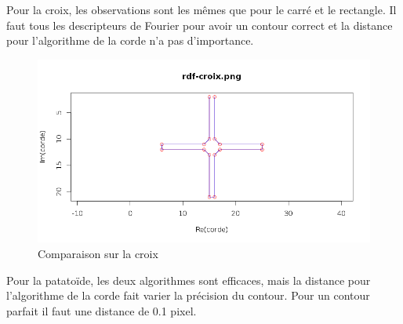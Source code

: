 \documentclass[11pt]{article}
\begin{document}
  \newpage
  
  Pour la croix, les observations sont les mêmes que pour le carré et le rectangle. Il faut tous
  les descripteurs de Fourier pour avoir un contour correct et la distance pour l'algorithme de la
  corde n'a pas d'importance.
  
  \begin{center}
    \begin{figure}[!h]
      \includegraphics[width=15cm]{../resultat/comp_croix.png}
      \caption{Comparaison sur la croix}
    \end{figure}
  \end{center}
  
  \newpage
  
  Pour la patatoïde, les deux algorithmes sont efficaces, mais la distance pour l'algorithme de 
  la corde fait varier la précision du contour. Pour un contour parfait il faut une distance de 0.1 pixel.
  
\end{document}
